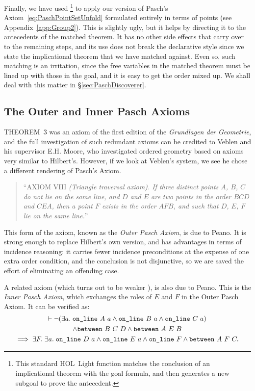 Finally, we have used \footnote{This standard HOL~Light function matches the conclusion of an implicational theorem with the goal formula, and then generates a new subgoal to prove the antecedent.} to apply our version of Pasch's Axiom~\eqref{eq:PaschPointSetUnfold} formulated entirely in terms of points (see Appendix~\ref{app:Group2}). This is slightly ugly, but it helps  by directing it to the antecedents of the matched theorem. It has no other side effects that carry over to the remaining steps, and its use does not break the declarative style since we state the implicational theorem that we have matched against. Even so, such matching is an irritation, since the free variables in the matched theorem must be lined up with those in the goal, and it is easy to get the order mixed up. We shall deal with this matter in \S\ref{sec:PaschDiscoverer}.

\subsection{The Outer and Inner Pasch Axioms}
THEOREM~3 was an axiom of the first edition of the \emph{Grundlagen der Geometrie}, and the full investigation of such redundant axioms can be credited to Veblen and his supervisor E.H. Moore, who investigated ordered geometry based on axioms very similar to Hilbert's. However, if we look at Veblen's system, we see he chose a different rendering of Pasch's Axiom.
\begin{quote}
  ``AXIOM VIII \emph{(Triangle traversal axiom). If three distinct points $A$, $B$, $C$ do not lie on the same line, and $D$ and $E$ are two points in the order $BCD$ and $CEA$, then a point $F$ exists in the order $AFB$, and such that $D$, $E$, $F$ lie on the same line.}''
\end{quote}

This form of the axiom, known as the \emph{Outer Pasch Axiom}, is due to Peano. It is strong enough to replace Hilbert's own version, and has advantages in terms of incidence reasoning: it carries fewer incidence preconditions at the expense of one extra order condition, and the conclusion is not disjunctive, so we are saved the effort of eliminating an offending case.

A related axiom (which turns out to be weaker \cite{PaschForms}), is also due to Peano. This is the \emph{Inner Pasch Axiom}, which exchanges the roles of $E$ and $F$ in the Outer Pasch Axiom. It can be verified as:
\begin{multline}\label{eq:InnerPaschWeak}
  \vdash\neg(\exists a.\; \texttt{on\_line}\ A\ a\wedge \texttt{on\_line}\ B\ a\wedge \texttt{on\_line}\ C\ a) \\
\wedge \texttt{between}\ B\ C\ D \wedge \texttt{between}\ A\ E\ B\\ 
\implies \exists F.\;\exists a.\;  \texttt{on\_line}\ D\ a \wedge \texttt{on\_line}\ E\ a \wedge \texttt{on\_line}\ F \wedge \texttt{between}\ A\ F\ C.
\end{multline}

